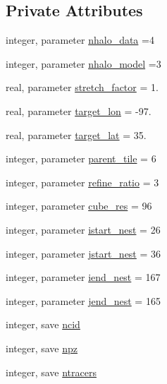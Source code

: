 \subsection*{Private Attributes}
\begin{DoxyCompactItemize}
\item 
integer, parameter \hyperlink{classfv__regional__mod_ace154d36bee6c72b51943cfb94b9de9a}{nhalo\-\_\-data} =4
\item 
integer, parameter \hyperlink{classfv__regional__mod_aa41184f5720c2bb3148d0ee0e18c1eff}{nhalo\-\_\-model} =3
\item 
real, parameter \hyperlink{classfv__regional__mod_ac8743a9351000e8f9867442d74f27deb}{stretch\-\_\-factor} = 1.
\item 
real, parameter \hyperlink{classfv__regional__mod_afad48457183ea13095892d3d0831cecb}{target\-\_\-lon} = -\/97.
\item 
real, parameter \hyperlink{classfv__regional__mod_aaf300439aa3eac86faaf7f26f41e1bcd}{target\-\_\-lat} = 35.
\item 
integer, parameter \hyperlink{classfv__regional__mod_aea80f27ba09a8d5a80ed70efe8a15da3}{parent\-\_\-tile} = 6
\item 
integer, parameter \hyperlink{classfv__regional__mod_a9d0455a3e9bf0fc4147b96aae64bf741}{refine\-\_\-ratio} = 3
\item 
integer, parameter \hyperlink{classfv__regional__mod_a2ea6f77a01d43a1e3d47993612aa45c5}{cube\-\_\-res} = 96
\item 
integer, parameter \hyperlink{classfv__regional__mod_a12a863dffbbb16718ce4b2e1fbb7acaa}{istart\-\_\-nest} = 26
\item 
integer, parameter \hyperlink{classfv__regional__mod_a675de8ff14de24134c9d15abc2e2de40}{jstart\-\_\-nest} = 36
\item 
integer, parameter \hyperlink{classfv__regional__mod_a46c63eb6b1a90522b1981ef852cf36db}{iend\-\_\-nest} = 167
\item 
integer, parameter \hyperlink{classfv__regional__mod_a4d47ea369899bf92a118fcc384d143c6}{jend\-\_\-nest} = 165
\item 
integer, save \hyperlink{classfv__regional__mod_a4d4fa505ef6e59899c62c7e52d14fefc}{ncid}
\item 
integer, save \hyperlink{classfv__regional__mod_a66c4d15d316eeb5577275a92f68c14c1}{npz}
\item 
integer, save \hyperlink{classfv__regional__mod_a59026f4c5f7fbd69bbaf1c53c9418817}{ntracers}
\item 

\end{DoxyCompactItemize}
